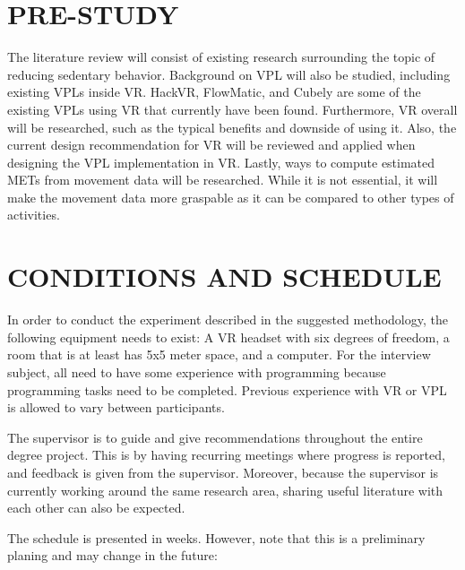 \documentclass{sigchi}
\begin{document}
\section{PRE-STUDY}
The literature review will consist of existing research surrounding the topic of reducing sedentary behavior. Background on VPL will also be studied, including existing VPLs inside VR. HackVR, FlowMatic, and Cubely are some of the existing VPLs using VR that currently have been found. Furthermore, VR overall will be researched, such as the typical benefits and downside of using it. Also, the current design recommendation for VR will be reviewed and applied when designing the VPL implementation in VR. Lastly, ways to compute estimated METs from movement data will be researched. While it is not essential, it will make the movement data more graspable as it can be compared to other types of activities.

\section{CONDITIONS AND SCHEDULE}
In order to conduct the experiment described in the suggested methodology, the following equipment needs to exist: A VR headset with six degrees of freedom, a room that is at least has 5x5 meter space, and a computer. For the interview subject, all need to have some experience with programming because programming tasks need to be completed. Previous experience with VR or VPL is allowed to vary between participants.

The supervisor is to guide and give recommendations throughout the entire degree project. This is by having recurring meetings where progress is reported, and feedback is given from the supervisor. Moreover, because the supervisor is currently working around the same research area, sharing useful literature with each other can also be expected.

The schedule is presented in weeks. However, note that this is a preliminary planing and may change in the future:
\end{document}
